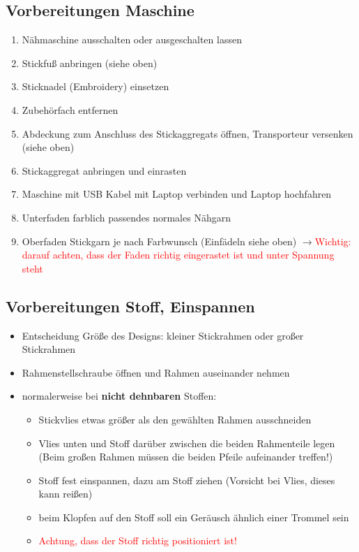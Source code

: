 \documentclass{\basedir/fablab-document}
\newcommand{\pfeil}{\ensuremath{\rightarrow}}
\begin{document}
\subsection{Vorbereitungen Maschine}
\begin{enumerate}
	\item Nähmaschine ausschalten oder ausgeschalten lassen
	\item Stickfuß anbringen (siehe oben)
	\item Sticknadel (Embroidery) einsetzen
	\item Zubehörfach entfernen
	\item Abdeckung zum Anschluss des Stickaggregats öffnen, Transporteur versenken (siehe oben)
	\item Stickaggregat anbringen und einrasten
	\item Maschine mit USB Kabel mit Laptop verbinden und Laptop hochfahren
	\item Unterfaden farblich passendes normales Nähgarn
	\item Oberfaden Stickgarn je nach Farbwunsch (Einfädeln siehe oben) \pfeil \textcolor{red}{Wichtig: darauf achten, dass der Faden richtig eingerastet ist und unter Spannung steht}
\end{enumerate}

\subsection{Vorbereitungen Stoff, Einspannen}
\begin{itemize}
	\item Entscheidung Größe des Designs: kleiner Stickrahmen oder großer Stickrahmen
	\item Rahmenstellschraube öffnen und Rahmen auseinander nehmen
	\item normalerweise bei \textbf{nicht dehnbaren} Stoffen:
	\begin{itemize}
		\item Stickvlies etwas größer als den gewählten Rahmen ausschneiden
		\item Vlies unten und Stoff darüber zwischen die beiden Rahmenteile legen (Beim großen Rahmen müssen die beiden Pfeile aufeinander treffen!)
		\item Stoff fest einspannen, dazu am Stoff ziehen (Vorsicht bei Vlies, dieses kann reißen)
		\item beim Klopfen auf den Stoff soll ein Geräusch ähnlich einer Trommel sein
		\item \textcolor{red}{Achtung, dass der Stoff richtig positioniert ist!} 
	\end{itemize}
\end{itemize} 
\end{document}
